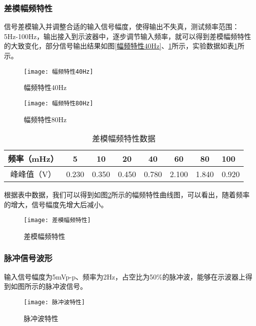 \documentclass{zjureport}
\begin{document}
\subsubsection{差模幅频特性}

信号差模输入并调整合适的输入信号幅度，使得输出不失真，测试频率范围：5Hz-100Hz，输出接入到示波器中，逐步调节输入频率，就可以得到差模幅频特性的大致变化，部分信号输出结果如图\ref{幅频特性40Hz}、\ref{幅频特性80Hz}所示，实验数据如表\ref{差模幅频特性数据}所示。

\begin{figure}[H]
	\centering
	\begin{minipage}[t]{0.49\linewidth}%
		\texttt{[image: 幅频特性40Hz]}%
		\caption{幅频特性40Hz}
		\label{幅频特性40Hz}
	\end{minipage}%
	\begin{minipage}[t]{0.49\linewidth}
		\texttt{[image: 幅频特性80Hz]}
		\caption{幅频特性80Hz}
		\label{幅频特性80Hz}
	\end{minipage}
\end{figure}

\begin{table}[htbp]
	\centering
	\begin{tabular}{ c c c c c c c p{1.5cm}}
		\hline
		频率（mHz） & 5 & 10 & 20 & 40 & 60 & 80 & 100  \\
		\hline
		峰峰值（V）  & 0.230 & 0.350 & 0.450 & 0.780 & 2.100 & 1.840 & 0.920 \\
		\hline
	\end{tabular}
	\caption{差模幅频特性数据}\label{差模幅频特性数据}
\end{table}

根据表中数据，我们可以得到如图\ref{差模幅频特性}所示的幅频特性曲线图，可以看出，随着频率的增大，信号幅度先增大后减小。

\begin{figure}[h]
	\centering%
	\texttt{[image: 差模幅频特性]}
	\caption{差模幅频特性}%
	\label{差模幅频特性}%
\end{figure}

\subsubsection{脉冲信号波形}

输入信号幅度为5mVp-p、频率为2Hz，占空比为50\%的脉冲波，能够在示波器上得到如图所示的脉冲波信号。

\begin{figure}[h]
	\centering%
	\texttt{[image: 脉冲波特性]}
	\caption{脉冲波特性}%
	\label{脉冲波特性}%
\end{figure}
\end{document}
